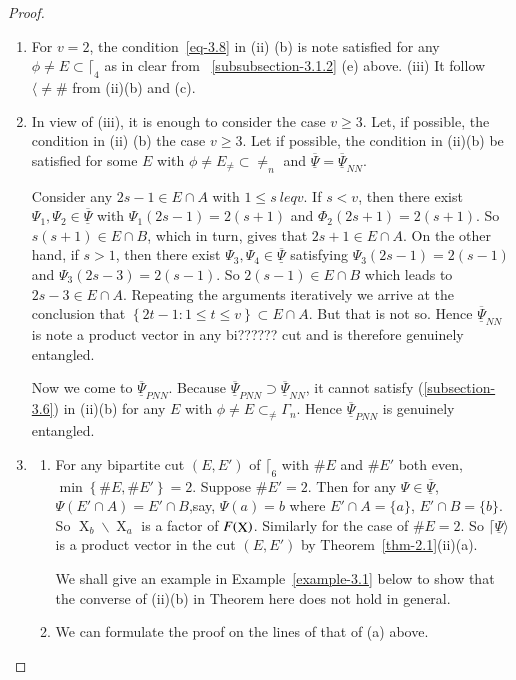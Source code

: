 \documentclass[a4paper,12pt]{article}
\DeclareMathOperator{\x}{\mathrm{X}}
\theoremstyle{definition}
\theoremstyle{underlinethm}
\theoremstyle{definition}
\begin{document}
\begin{proof}
\begin{enumerate}[label=(\roman*)]
\item For $v=2$, the condition~\ref{eq-3.8}   in (ii) (b) is note satisfied for any $\phi \neq E \subset \lceil_{4}$ as in clear from ~\ref{subsubsection-3.1.2} (e) above. (iii) It follow $\langle \neq \#$ from (ii)(b) and (c).

\item In view of (iii), it is enough to consider the case $v \geq 3$. Let, if possible, the condition in (ii) (b) the case $v \geq 3$. Let if possible, the condition in (ii)(b) be satisfied for some $E$ with $\phi \neq E_{\neq} \subset \neq_{n}$ and $\underline{\overline{\Psi}}= \underline{\overline{\Psi}}_{NN}$.

Consider any $2s-1 \in E \cap A$ with $1 \leq s\ leq v$. If $s < v$, then there exist $\Psi_{1}, \Psi_{2} \in \underline{\overline{\Psi}}$ with $\Psi_{1} (2s-1) = 2(s + 1)$ and $\Phi_{2} (2s+1) = 2(s+ 1)$. So $s(s+ 1) \in E \cap B$, which in turn, gives that $2s+1 \in E \cap A$. On the other hand, if $s > 1$, then there exist $\Psi_{3}, \Psi_{4} \in \underline{\overline{\Psi}}$ satisfying $\Psi_{3}(2s-1)= 2(s-1)$ and $\Psi_{3}(2s-3) =2 (s-1)$. So $2(s-1) \in E \cap B$ which leads to $2s-3 \in E \cap A$. Repeating the arguments iteratively we arrive at the conclusion that $\left\{2t-1 : 1 \leq t \leq v \right\} \subset E \cap A$. But that is not so. Hence $\underline{\overline{\Psi}}_{NN}$ is note a product vector in any bi?????? cut and is therefore genuinely entangled.  

Now we come to $\underline{\overline{\Psi}}_{PNN}$. Because $\underline{\overline{\Psi}}_{PNN} \supset \underline{\overline{\Psi}}_{NN}$, it cannot satisfy (\ref{subsection-3.6}) in (ii)(b) for any $E$ with $\phi \neq E \subset_{\neq} \Gamma_{n}$. Hence $\underline{\overline{\Psi}}_{PNN}$ is genuinely entangled.

\item 
\begin{enumerate}[label=(\alph*)]
\item For any bipartite cut $(E, E')$ of $\lceil_{6}$ with $\#E$ and $\#E'$ both even,\break $\min\left\{\# E, \# E'\right\}=2$. Suppose $\#E'=2$. Then for any $\Psi \in \underline{\overline{\Psi}}$, $\Psi (E' \cap A) = E' \cap B$,say, $\Psi(a) = b$ where $E'\cap A = \{a\}$, $E'\cap B=\{b\}$. So $\x_{b} \smallsetminus \x_{a}$ is a factor of $F(\bold{\x})$. Similarly for the case of $\# E=2$. So $\lceil\underline{\Psi}\rangle$ is a product vector in the cut $(E, E')$ by Theorem~\ref{thm-2.1}(ii)(a).

We shall give an example in Example~\ref{example-3.1} below to show that the converse of (ii)(b) in Theorem here does not hold in general.

\item We can formulate the proof on the lines of that of (a) above.

\end{enumerate}

\end{enumerate}

\end{proof}
\end{document}
